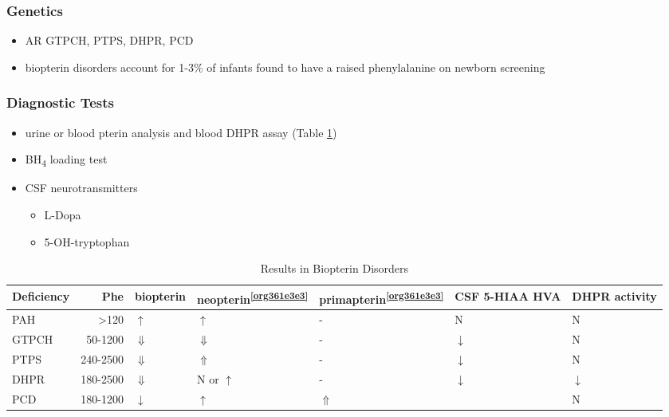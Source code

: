 \documentclass[12pt]{scrartcl}
\begin{document}
\subsubsection{Genetics}
\label{sec:orgdce2ee2}
\begin{itemize}
\item AR GTPCH, PTPS, DHPR, PCD
\item biopterin disorders account for 1-3\% of infants found to have a
raised phenylalanine on newborn screening
\end{itemize}

\subsubsection{Diagnostic Tests}
\label{sec:orgd0058fa}
\begin{itemize}
\item urine or blood pterin analysis and blood DHPR assay (Table \ref{tab:org649e1fa})
\item BH\textsubscript{4} loading test
\item CSF neurotransmitters
\begin{itemize}
\item L-Dopa
\item 5-OH-tryptophan
\end{itemize}
\end{itemize}

\begin{table}[htbp]
\caption{\label{tab:org649e1fa}Results in Biopterin Disorders}
\centering
\begin{tabular}{lrlllll}
Deficiency & Phe & biopterin\footnotemark & neopterin\textsuperscript{\ref{org361e3e3}} & primapterin\textsuperscript{\ref{org361e3e3}} & CSF 5-HIAA HVA & DHPR activity\\
\hline
PAH & \textgreater{}120 & \(\uparrow\) & \(\uparrow\) & - & N & N\\
GTPCH & 50-1200 & \(\Downarrow\) & \(\Downarrow\) & - & \(\downarrow\) & N\\
PTPS & 240-2500 & \(\Downarrow\) & \(\Uparrow\) & - & \(\downarrow\) & N\\
DHPR & 180-2500 & \(\Downarrow\) & N or \(\uparrow\) & - & \(\downarrow\) & \(\downarrow\)\\
PCD & 180-1200 & \(\downarrow\) & \(\uparrow\) & \(\Uparrow\) &  & N\\
\end{tabular}
\end{table}
\end{document}
